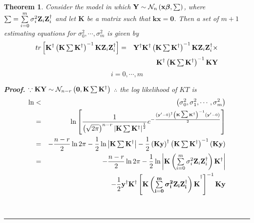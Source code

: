 \documentclass{article}
\newtheorem{theorem}{Theorem}
\newenvironment{proof}[1][Proof]{\noindent\textbf{#1.} }{\ \rule{0.5em}{0.5em}}
\begin{document}
\begin{theorem}
Consider the model in which $\mathbf{Y}\sim \mathcal{N}_{n}\left( \mathbf{%
x\beta },\tsum \right) $, where $\tsum =\tsum\limits_{i=0}^{m}\sigma _{i}^{2}%
\mathbf{Z}_{i}\mathbf{Z}_{i}^{\dagger }$ and let $\mathbf{K}$ be a matrix
such that $\mathbf{kx}=\mathbf{0}$. Then a set of $m+1$ estimating equations
for $\sigma _{0}^{2},\cdots ,\sigma _{m}^{2}$ is given by%
\begin{eqnarray*}
tr\left[ \mathbf{K}^{\dagger }\left( \mathbf{K}\tsum \mathbf{K}^{\dagger
}\right) ^{-1}\mathbf{KZ}_{i}\mathbf{Z}_{i}^{\dagger }\right]  &=&\mathbf{Y}%
^{\dagger }\mathbf{K}^{\dagger }\left( \mathbf{K}\tsum \mathbf{K}^{\dagger
}\right) ^{-1}\mathbf{KZ}_{i}\mathbf{Z}_{i}^{\dagger }\times  \\
&&\mathbf{K}^{\dagger }\left( \mathbf{K}\tsum \mathbf{K}^{\dagger }\right)
^{-1}\mathbf{KY}
\end{eqnarray*}%
\begin{equation*}
i=0,\cdots ,m
\end{equation*}

\begin{proof}
\newline
$\because \mathbf{KY}\sim \mathcal{N}_{n-r}\left( \mathbf{0},\mathbf{K}\mathop{\textstyle \sum } 
\mathbf{K}^{\dagger }\right) $\newline
$\therefore $ the log likelihood of $KT$ is%
\begin{eqnarray*}
\ln  &<&\left( \sigma _{0}^{2},\sigma _{1}^{2},\cdots ,\sigma
_{m}^{2}\right)  \\
&=&\ln \left[ \frac{1}{\left( \sqrt{2\pi }\right) ^{n-r}\left\vert \mathbf{K}%
\tsum \mathbf{K}^{\dagger }\right\vert ^{\frac{1}{2}}}e^{-\frac{\left( 
\mathbf{y}^{\prime }-0\right) ^{\dagger }\left( \mathbf{K}\tsum \mathbf{K}%
^{\dagger }\right) ^{-1}\left( \mathbf{y}^{\prime }-0\right) }{2}}\right]  \\
&=&-\frac{n-r}{2}\ln 2\pi -\frac{1}{2}\ln \left\vert \mathbf{K}\tsum \mathbf{%
K}^{\dagger }\right\vert -\frac{1}{2}\left( \mathbf{Ky}\right) ^{\dagger
}\left( \mathbf{K}\tsum \mathbf{K}^{\dagger }\right) ^{-1}\left( \mathbf{Ky}%
\right)  \\
&=&-\frac{n-r}{2}\ln 2\pi -\frac{1}{2}\ln \left\vert \mathbf{K}\left(
\tsum\limits_{i=0}^{m}\sigma _{i}^{2}\mathbf{Z}_{i}\mathbf{Z}_{i}^{\dagger
}\right) \mathbf{K}^{\dagger }\right\vert  \\
&&-\frac{1}{2}\mathbf{y}^{\dagger }\mathbf{K}^{\dagger }\left[ \mathbf{%
K\left( \tsum\limits_{i=0}^{m}\sigma _{i}^{2}\mathbf{Z}_{i}\mathbf{Z}%
_{i}^{\dagger }\right) K}^{\dagger }\right] ^{-1}\mathbf{Ky}
\end{eqnarray*}


\end{proof}
\end{theorem}
\end{document}
